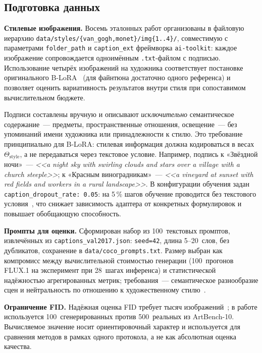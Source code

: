
\subsection{Подготовка данных}
\label{sec:preprocessing}

\textbf{Стилевые изображения.} Восемь эталонных работ организованы в файловую иерархию \texttt{data/styles/\{van\_gogh,monet\}/img\{1..4\}/}, совместимую с параметрами \texttt{folder\_path} и \texttt{caption\_ext} фреймворка \texttt{ai-toolkit}: каждое изображение сопровождается одноимённым \texttt{.txt}-файлом с подписью. Использование четырёх изображений на художника соответствует постановке оригинального B-LoRA~\cite{frenkel2024blora} (для файнтюна достаточно одного референса) и позволяет оценить вариативность результатов внутри стиля при сопоставимом вычислительном бюджете.

Подписи составлены вручную и описывают \textit{исключительно} семантическое содержание~--- предметы, пространственные отношения, освещение~--- без упоминаний имени художника или принадлежности к стилю. Это требование принципиально для B-LoRA: стилевая информация должна кодироваться в весах $\Theta_\text{style}$, а не передаваться через текстовое условие. Например, подпись к «Звёздной ночи»~--- \textit{<<a night sky with swirling clouds and stars over a village with a church steeple>>}; к «Красным виноградникам»~--- \textit{<<a vineyard at sunset with red fields and workers in a rural landscape>>}. В конфигурации обучения задан \texttt{caption\_dropout\_rate: 0.05}: на 5\,\% шагов обучение проводится без текстового условия~\cite{ho2022cfg}, что снижает зависимость адаптера от конкретных формулировок и повышает обобщающую способность.

\textbf{Промпты для оценки.} Сформирован набор из 100~текстовых промптов, извлечённых из \texttt{captions\_val2017.json}: \texttt{seed=42}, длина 5--20~слов, без дубликатов, сохранение в \texttt{data/coco\_prompts.txt}. Размер выбран как компромисс между вычислительной стоимостью генерации (100~прогонов FLUX.1 на эксперимент при 28~шагах инференса) и статистической надёжностью агрегированных метрик; требования~--- семантическое разнообразие сцен и нейтральность по отношению к художественному стилю~\cite{lin2014coco}.

\textbf{Ограничение FID.} Надёжная оценка FID требует тысяч изображений~\cite{heusel2017fid,parmar2022cleanfid}; в работе используется 100~сгенерированных против 500~реальных из ArtBench-10. Вычисляемое значение носит ориентировочный характер и используется для сравнения методов в рамках одного протокола, а не как абсолютная оценка качества.
